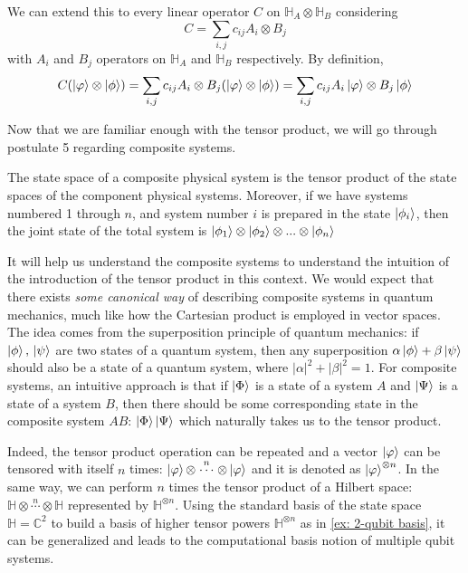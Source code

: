We can extend this to every linear operator $C$ on $\mathbb{H}_A \otimes \mathbb{H}_B$ considering 
$$C = \sum_{i,j} c_{ij} A_i \otimes B_j$$
with $A_i$ and $B_j$ operators on $\mathbb{H}_A$ and $\mathbb{H}_B$ respectively. By definition, 
$$C(\ket{\varphi} \otimes \ket{\phi}) = \sum_{i,j} c_{ij} A_i \otimes B_j (\ket{\varphi} \otimes \ket{\phi}) = \sum_{i,j} c_{ij}A_i \ket{\varphi} \otimes B_j \ket{\phi}$$

Now that we are familiar enough with the tensor product, we will go through postulate 5 regarding composite systems.

\begin{tcolorbox}[title=Postulate $5$]

    The state space of a composite physical system is the tensor product of the state spaces of the component physical systems. Moreover, if we have systems numbered 1 through $n$, and system number $i$ is prepared in the state $\ket{\phi_i}$, then the joint state of the total system is ${\ket{\phi_1}\otimes\ket{\phi_2}\otimes ... \otimes \ket{\phi_n}}$
\end{tcolorbox}

It will help us understand the composite systems to understand the intuition of the introduction of the tensor product in this context.  We would expect that there exists \textit{some canonical way} of describing composite systems in quantum mechanics, much like how the Cartesian product is employed in vector spaces. The idea comes from the superposition principle of quantum mechanics: if $\ket{\phi}, \, \ket{\psi}$ are two states of a quantum system, then any superposition $\alpha \ket{\phi} + \beta \ket{\psi}$ should also be a state of a quantum system, where $|\alpha|^2 +|\beta|^2 = 1$. For composite systems, an intuitive approach is that if $\ket{\Phi}$ is a state of a system $A$ and $\ket{\Psi}$ is a state of a system $B$, then there should be some corresponding state in the composite system $AB$: $\ket{\Phi}\ket{\Psi}$ which naturally takes us to the tensor product. 

Indeed, the tensor product operation can be repeated and a vector $\ket{\varphi}$ can be tensored with itself $n$ times: $\ket{\varphi} \otimes \stackrel{n}{\cdots} \otimes \ket{\varphi}$ and it is denoted as $\ket{\varphi}^{\otimes n}$. In the same way, we can perform $n$ times the tensor product of a Hilbert space: $\mathbb{H} \otimes \stackrel{n}{\cdots} \otimes \mathbb{H}$ represented by $\mathbb{H}^{\otimes n }$. Using the standard basis of the state space $\mathbb{H}=\mathbb{C}^2$ to build a basis of higher tensor powers $\mathbb{H}^{\otimes n}$ as in \autoref{ex: 2-qubit basis}, it can be generalized and leads to the computational basis notion of multiple qubit systems.

